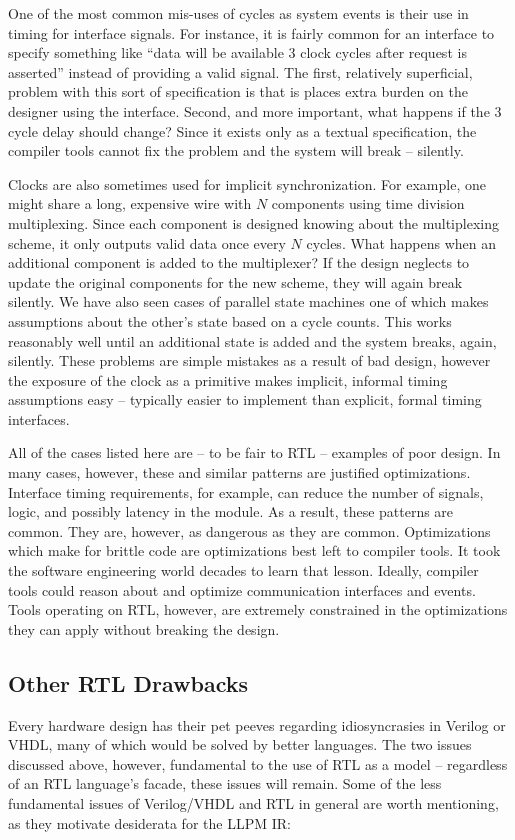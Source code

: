 One of the most common mis-uses of cycles as system events is their use in
timing for interface signals. For instance, it is fairly common for an
interface to specify something like ``data will be available 3 clock cycles
after request is asserted'' instead of providing a valid signal. The first,
relatively superficial, problem with this sort of specification is that is
places extra burden on the designer using the interface. Second, and more
important, what happens if the 3 cycle delay should change? Since it exists
only as a textual specification, the compiler tools cannot fix the problem and
the system will break -- silently.

Clocks are also sometimes used for implicit synchronization. For example, one
might share a long, expensive wire with $N$ components using time division
multiplexing. Since each component is designed knowing about the multiplexing
scheme, it only outputs valid data once every $N$ cycles. What happens when an
additional component is added to the multiplexer? If the design neglects to
update the original components for the new scheme, they will again break
silently. We have also seen cases of parallel state machines one of which
makes assumptions about the other's state based on a cycle counts. This works
reasonably well until an additional state is added and the system breaks,
again, silently. These problems are simple mistakes as a result of bad design,
however the exposure of the clock as a primitive makes implicit, informal
timing assumptions easy -- typically easier to implement than explicit, formal
timing interfaces.

All of the cases listed here are -- to be fair to RTL -- examples of poor
design. In many cases, however, these and similar patterns are justified
optimizations. Interface timing requirements, for example, can reduce the
number of signals, logic, and possibly latency in the module. As a result,
these patterns are common. They are, however, as dangerous as they are common.
Optimizations which make for brittle code are optimizations best left to
compiler tools. It took the software engineering world decades to learn that
lesson. Ideally, compiler tools could reason about and optimize communication
interfaces and events. Tools operating on RTL, however, are extremely
constrained in the optimizations they can apply without breaking the design.

\subsection{Other RTL Drawbacks}
Every hardware design has their pet peeves regarding idiosyncrasies in Verilog
or VHDL, many of which would be solved by better languages. The two issues
discussed above, however, fundamental to the use of RTL as a model --
regardless of an RTL language's facade, these issues will remain. Some of the
less fundamental issues of Verilog/VHDL and RTL in general are worth
mentioning, as they motivate desiderata for the LLPM IR:

